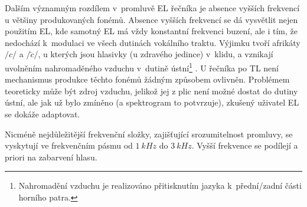 Dalším významným rozdílem v~promluvě EL řečníka je absence vyšších frekvencí u většiny produkovaných fonémů.
Absence vyšších frekvencí se dá vysvětlit nejen použitím EL, kde samotný EL má vždy konstantní frekvenci buzení, ale i tím, že nedochází  k~modulaci ve všech dutinách vokálního traktu.
Výjimku tvoří afrikáty $/c/$ a $/\check{c}/$, u kterých jsou hlasivky (u zdravého jedince) v~klidu, a vznikají uvolněním nahromaděného vzduchu v~dutině ústní\footnote{Nahromadění vzduchu je realizováno přitisknutím jazyka  k~přední/zadní části horního patra.} \cite{Psutka2006}.
U řečníka po TL není mechanismus produkce těchto fonémů žádným způsobem ovlivněn.
Problémem teoreticky může být zdroj vzduchu, jelikož jej z plic není možné dostat do dutiny ústní, ale jak už bylo zmíněno (a spektrogram to potvrzuje), zkušený uživatel EL se dokáže adaptovat.

 Nicméně nejdůležitější frekvenční složky, zajišťující srozumitelnost promluvy, se vyskytují ve frekvenčním pásmu od $1\ kHz$ do $3\ kHz$.
 Vyšší frekvence se podílejí a priori na zabarvení hlasu.

